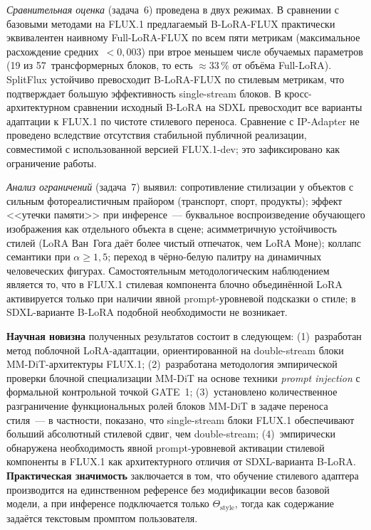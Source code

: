 \textit{Сравнительная оценка} (задача~6) проведена в двух режимах. В сравнении
с базовыми методами на FLUX.1 предлагаемый B-LoRA-FLUX практически эквивалентен
наивному Full-LoRA-FLUX по всем пяти метрикам (максимальное расхождение
средних~$<\!0{,}003$) при втрое меньшем числе обучаемых параметров
(19 из 57~трансформерных блоков, то есть ${\approx}33\,\%$ от объёма
Full-LoRA). SplitFlux устойчиво
превосходит B-LoRA-FLUX по стилевым метрикам, что подтверждает большую
эффективность single-stream блоков. В кросс-архитектурном сравнении исходный
B-LoRA на SDXL превосходит все варианты адаптации к FLUX.1 по чистоте стилевого
переноса. Сравнение с IP-Adapter не проведено вследствие отсутствия стабильной
публичной реализации, совместимой с использованной версией FLUX.1-dev;
это зафиксировано как ограничение работы.

\textit{Анализ ограничений} (задача~7) выявил: сопротивление стилизации
у объектов с сильным фотореалистичным прайором (транспорт, спорт, продукты);
эффект <<утечки памяти>> при инференсе~--- буквальное воспроизведение обучающего
изображения как отдельного объекта в сцене; асимметричную устойчивость стилей
(LoRA Ван~Гога даёт более чистый отпечаток, чем LoRA Моне); коллапс семантики
при $\alpha\geq 1{,}5$; переход в чёрно-белую палитру на динамичных человеческих
фигурах. Самостоятельным методологическим наблюдением является то, что в FLUX.1
стилевая компонента блочно объединённой LoRA активируется только при наличии
явной prompt-уровневой подсказки о стиле; в SDXL-варианте B-LoRA подобной
необходимости не возникает.

\textbf{Научная новизна} полученных результатов состоит в следующем:
(1)~разработан метод поблочной LoRA-адаптации, ориентированной на
double-stream блоки MM-DiT-архитектуры FLUX.1;
(2)~разработана методология эмпирической проверки блочной специализации
MM-DiT на основе техники \textit{prompt injection} с формальной контрольной
точкой GATE~1;
(3)~установлено количественное разграничение функциональных ролей блоков
MM-DiT в задаче переноса стиля~--- в частности, показано, что single-stream
блоки FLUX.1 обеспечивают больший абсолютный стилевой сдвиг, чем
double-stream;
(4)~эмпирически обнаружена необходимость явной prompt-уровневой активации
стилевой компоненты в FLUX.1 как архитектурного отличия от SDXL-варианта
B-LoRA.
\textbf{Практическая значимость} заключается в том, что обучение стилевого
адаптера производится на единственном референсе без модификации весов базовой
модели, а при инференсе подключается только $\Theta_\text{style}$, тогда как
содержание задаётся текстовым промптом пользователя.

